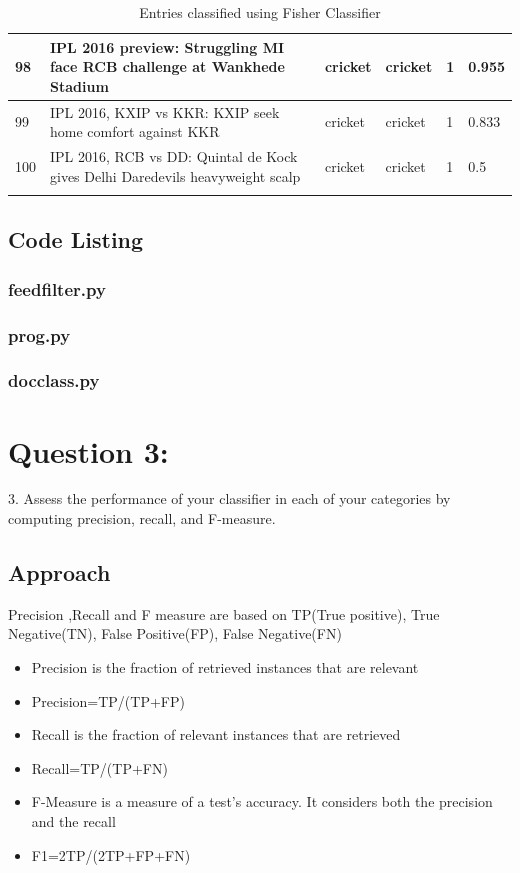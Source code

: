\documentclass[12pt]{article}
\begin{document}
\begin{longtable}{|p{2.0cm} | p{6.0cm} | p{2.0cm} |p{2.0cm}| p{2.0cm}|p{2.0cm}|}
98 & IPL 2016 preview: Struggling MI face RCB challenge at Wankhede Stadium & cricket & cricket & 1 & 0.955 \\\hline													
99 & IPL 2016, KXIP vs KKR: KXIP seek home comfort against KKR & cricket & cricket & 1 & 0.833 \\\hline													
100 & IPL 2016, RCB vs DD: Quintal de Kock gives Delhi Daredevils heavyweight scalp & cricket & cricket & 1 & 0.5 \\\hline													
 \caption{Entries classified using Fisher Classifier}
\end{longtable}



\subsection{Code Listing}
\subsubsection{feedfilter.py}

\newpage

\subsubsection{prog.py}

\subsubsection{docclass.py}








\section{Question 3: }
3.  Assess the performance of your classifier in each of your
categories by computing precision, recall, and F-measure.  
\subsection{Approach}
Precision ,Recall and F measure are based on TP(True positive), True Negative(TN), False Positive(FP), False Negative(FN)


\begin{itemize}
\item Precision  is the fraction of retrieved instances that are relevant
\item Precision=TP/(TP+FP)
\item Recall  is the fraction of relevant instances that are retrieved
\item Recall=TP/(TP+FN)
\item F-Measure  is a measure of a test's accuracy. It considers both the precision  and the recall 
\item F1=2TP/(2TP+FP+FN)

\end{itemize}
\end{document}
